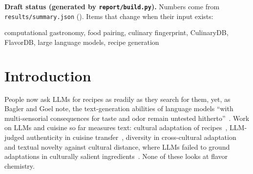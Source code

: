 \documentclass[conference]{IEEEtran}
\begin{document}
\ifdraftstatus
\begin{tcolorbox}[colback=yellow!5,colframe=PendingColor!60,boxrule=0.4pt,left=2pt,right=2pt,top=1pt,bottom=1pt,fontupper=\scriptsize]
\textbf{Draft status (generated by \texttt{report/build.py}).} Numbers come from \texttt{results/summary.json} (\NSummaryUTC). Items that change when their input exists:

\end{tcolorbox}
\fi

\begin{IEEEkeywords}
computational gastronomy, food pairing, culinary fingerprint, CulinaryDB, FlavorDB, large language models, recipe generation
\end{IEEEkeywords}

\section{Introduction}
People now ask LLMs for recipes as readily as they search for them, yet, as Bagler and Goel note, the text-generation abilities of language models ``with multi-sensorial consequences for taste and odor remain untested hitherto''~\cite{bagler2024}. Work on LLMs and cuisine so far measures text: cultural adaptation of recipes~\cite{cao2024}, LLM-judged authenticity in cuisine transfer~\cite{lee2024ash}, diversity in cross-cultural adaptation~\cite{hu2025carriage} and textual novelty against cultural distance, where LLMs failed to ground adaptations in culturally salient ingredients~\cite{carichon2026}. None of these looks at flavor chemistry.
\end{document}
